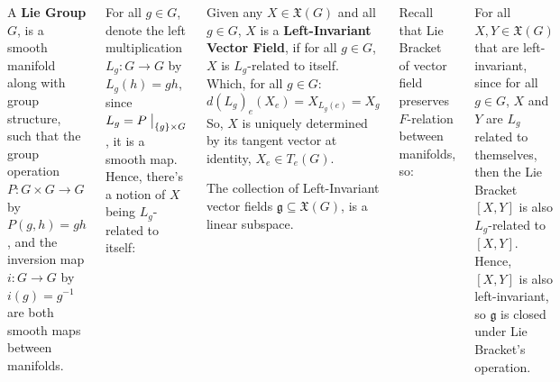 \documentclass[20pt,margin=0.9in,innermargin=-4.5in,blockverticalspace=-0.25in]{tikzposter}
\begin{document}
\begin{columns}
{        \begin{definitionBox}
            A \textbf{Lie Group} $G$, is a smooth manifold along with group structure, such that the group operation $P:G\times G\rightarrow G$ by $P(g,h) = gh$, and the inversion map $i:G\rightarrow G$ by $i(g)=g^{-1}$ are both smooth maps between manifolds.
        \end{definitionBox}

        For all $g\in G$, denote the left multiplication $L_g:G\rightarrow G$ by $L_g(h)=gh$,
        since $L_g = P\bigm|_{\{g\}\times G}$, it is a smooth map. Hence, there's a notion of $X$ being $L_g$-related to itself:

        \begin{definitionBox}
            Given any $X\in\mathfrak{X}(G)$ and all $g\in G$, $X$ is a \textbf{Left-Invariant Vector Field}, if for all $g\in G$, $X$ is $L_g$-related to itself. Which, for all $g\in G$: 
            $$d(L_g)_e(X_e) = X_{L_g(e)} = X_g$$ 
            So, $X$ is uniquely determined by its tangent vector at identity, $X_e\in T_e(G)$.

            The collection of Left-Invariant vector fields $\mathfrak{g}\subseteq \mathfrak{X}(G)$, is a linear subspace. 
            
        \end{definitionBox}

        Recall that Lie Bracket of vector field preserves $F$-relation between manifolds, so:
        \begin{theoremBox}
            For all $X,Y\in\mathfrak{X}(G)$ that are left-invariant, since for all $g\in G$, $X$ and $Y$ are $L_g$ related to themselves, then the Lie Bracket $[X,Y]$ is also $L_g$-related to $[X,Y]$. Hence, $[X,Y]$ is also left-invariant, so $\mathfrak{g}$ is closed under Lie Bracket's operation.
        \end{theoremBox}
    }


\end{columns}
\end{document}
